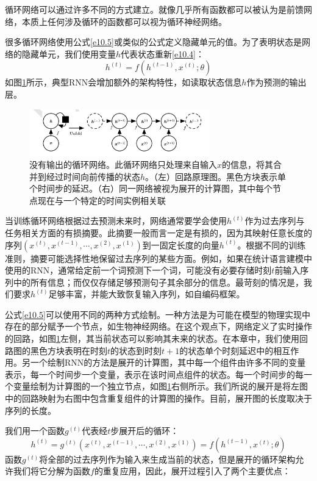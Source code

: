 \documentclass{ctexart}
\begin{document}
        循环网络可以通过许多不同的方式建立。就像几乎所有函数都可以被认为是前馈网络，本质上任何涉及循环的函数都可以视为循环神经网络。

        很多循环网络使用公式\ref{e10.5}或类似的公式定义隐藏单元的值。为了表明状态是网络的隐藏单元，我们使用变量$h$代表状态重新\ref{e10.4}：
        \begin{equation}
            h^{(t)} = f(h^{(t-1)},x^{(t)};\theta)
            \label{e10.5}
        \end{equation}
        如图\ref{f10.2}所示，典型RNN会增加额外的架构特性，如读取状态信息$h$作为预测的输出层。
        \begin{figure}
            \centering
            \includegraphics[width=0.7\textwidth]{f2}
            \caption{没有输出的循环网络。此循环网络只处理来自输入$x$的信息，将其合并到经过时间向前传播的状态$h$。（左）回路原理图。黑色方块表示单个时间步的延迟。（右）同一网络被视为展开的计算图，其中每个节点现在与一个特定的时间实例相关联}
            \label{f10.2}
        \end{figure}
        当训练循环网络根据过去预测未来时，网络通常要学会使用$h^{(t)}$作为过去序列与任务相关方面的有损摘要。此摘要一般而言一定是有损的，因为其映射任意长度的序列$(x^{(t)},x^{(t-1)},\cdots,x^{(2)},x^{(1)})$到一固定长度的向量$h^{(t)}$。根据不同的训练准则，摘要可能选择性地保留过去序列的某些方面。例如，如果在统计语言建模中使用的RNN，通常给定前一个词预测下一个词，可能没有必要存储时刻$t$前输入序列中的所有信息；而仅仅存储足够预测句子其余部分的信息。最苛刻的情况是，我们要求$h^{(t)}$足够丰富，并能大致恢复输入序列，如自编码框架。

        公式\ref{e10.5}可以使用不同的两种方式绘制。一种方法是为可能在模型的物理实现中存在的部分赋予一个节点，如生物神经网络。在这个观点下，网络定义了实时操作的回路，如图\ref{f10.2}左侧，其当前状态可以影响其未来的状态。在本章中，我们使用回路图的黑色方块表明在时刻$t$的状态到时刻$t+1$的状态单个时刻延迟中的相互作用。另一个绘制RNN的方法是展开的计算图，其中每一个组件由许多不同的变量表示，每一个时间步一个变量，表示在该时间点组件的状态。每一个时间步的每一个变量绘制为计算图的一个独立节点，如图\ref{f10.2}右侧所示。我们所说的展开是将左图中的回路映射为右图中包含重复组件的计算图的操作。目前，展开图的长度取决于序列的长度。

        我们用一个函数$g^{(t)}$代表经$t$步展开后的循环：
        \begin{equation}
            h^{(t)} = g^{(t)}(x^{(t)},x^{(t-1)},\cdots,x^{(2)},x^{(1)}) = f(h^{(t-1)},x^{(t)};\theta)
            \label{f10.7}
        \end{equation}
        函数$g^{(t)}$将全部的过去序列作为输入来生成当前的状态，但是展开的循环架构允许我们将它分解为函数$f$的重复应用，因此，展开过程引入了两个主要优点：
\end{document}
